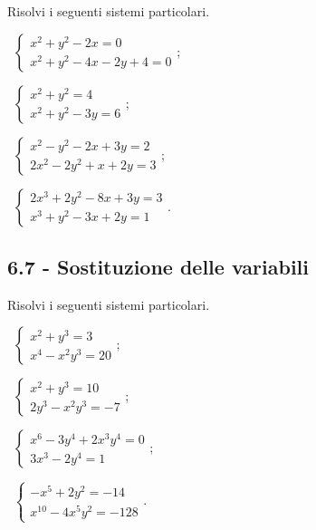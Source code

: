 \begin{esercizio}[\Ast]
 \label{ese:6.61}
Risolvi i seguenti sistemi particolari.
\begin{multicols}{2}
 \begin{enumeratea}
 \item~$\left\{\begin{array}{l}x^2+y^2-2x=0\\x^{2}+y^{2}-4x-2y+4=0\end{array}\right.$;
 \item~$\left\{\begin{array}{l}x^{2}+y^{2}=4 \\x^2+y^2-3y=6 \end{array}\right.$;
 \item~$\left\{\begin{array}{l}x^{2}-y^{2}-2x+3y=2 \\2x^2-2y^2+x+2y=3 \end{array}\right.$;
 \item~$\left\{\begin{array}{l}2x^3+2y^2-8x+3y=3 \\x^3+y^2-3x+2y=1 \end{array}\right.$.
 \end{enumeratea}
\end{multicols}
\end{esercizio}

\subsection*{6.7 - Sostituzione delle variabili}

\begin{esercizio}[\Ast]
 \label{ese:6.62}
Risolvi i seguenti sistemi particolari.
\begin{multicols}{2}
 \begin{enumeratea}
 \item~$\left\{\begin{array}{l}x^2+y^3=3\\x^{4}-x^{2}y^{3}=20\end{array}\right.$;
 \item~$\left\{\begin{array}{l}x^{2}+y^{3}=10 \\2y^{3}-x^{2}y^{3}=-7 \end{array}\right.$;
 \item~$\left\{\begin{array}{l}x^{6}-3y^{4}+2x^{3}y^{4}=0 \\3x^{3}-2y^{4}=1 \end{array}\right.$;
 \item~$\left\{\begin{array}{l}-x^5+2y^2=-14 \\x^{10}-4x^{5}y^{2}=-128 \end{array}\right.$.
 \end{enumeratea}
\end{multicols}
\end{esercizio}

